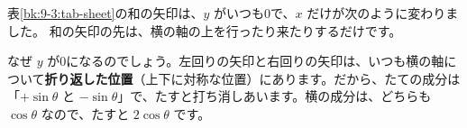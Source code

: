 


\label{bk:9-3:ya}表\ref{bk:9-3:tab-sheet}の和の矢印は、$y$ がいつも0で、$x$ だけが次のように変わりました。
和の矢印の先は、横の軸の上を行ったり来たりするだけです。

なぜ $y$ が0になるのでしょう。左回りの矢印と右回りの矢印は、いつも横の軸について\textbf{折り返した位置}（上下に対称な位置）にあります。だから、たての成分は「$+\sin\theta$ と $-\sin\theta$」で、たすと打ち消しあいます。横の成分は、どちらも $\cos\theta$ なので、たすと $2\cos\theta$ です。

